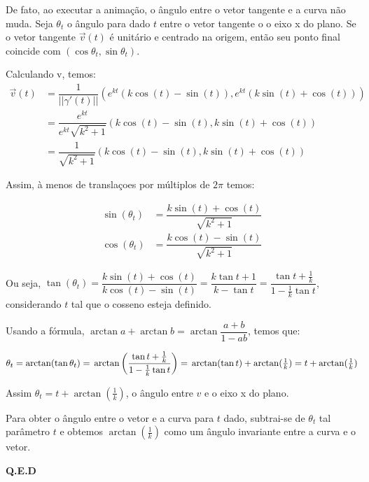 \documentclass[12pt,letterpaper]{article}
\begin{document}
\begin{enumerate}
	De fato, ao executar a animação, o ângulo entre o vetor tangente e a curva não muda. Seja $\theta_t$ o ângulo para dado $t$ entre o vetor tangente o o eixo x do plano. Se o vetor tangente $\vec v(t)$ é unitário e centrado na origem, então seu ponto final coincide com $(\cos \theta _t,\sin\theta _t)$.
	
	Calculando v, temos:
	\begin{align*}
		\vec v (t)&=\dfrac{1}{||\gamma'(t)||}\left(e^{k t} (k \cos(t) - \sin(t)), e^{kt} (k \sin(t) + \cos(t))\right)\\
		&=\dfrac{e^{kt}}{e^{k t}\sqrt{k^2 + 1} }\left(k \cos(t) - \sin(t), k \sin(t) + \cos(t)\right)\\
		&=\dfrac{1}{\sqrt{k^2 + 1} }\left(k \cos(t) - \sin(t), k \sin(t) + \cos(t)\right)
	\end{align*}
	
	Assim, à menos de translaçoes por múltiplos de $2\pi$ temos:
	
	\begin{align*}
	\sin (\theta_t)&=\dfrac{k \sin(t) + \cos(t)}{\sqrt{k^2 + 1}}\\
	\cos(\theta_t)&=\dfrac{k \cos(t) - \sin(t)}{\sqrt{k^2 + 1} }
	\end{align*}
	
	Ou seja, $\tan(\theta_t)=\dfrac{k \sin(t) + \cos(t)}{k \cos(t) - \sin(t)}=\dfrac{k\tan t+1}{k-\tan t}=\dfrac{\tan t+\frac1 k}{1-\frac1 k\tan t}$, considerando $t$ tal que o cosseno esteja definido.
	
	Usando a fórmula, $\arctan a + \arctan b = \arctan \dfrac {a + b} {1 - a b}$, temos que:
	
	$\theta_t=\arctan(\tan \theta_t)=\\\arctan\left(\dfrac{\tan t+\frac1 k}{1-\frac1 k\tan t}\right)=\\\arctan(\tan t)+\arctan(\frac1 k)= \\t+\arctan(\frac1 k)$
	
	Assim $\theta_t=t+\arctan(\frac1 k)$, o ângulo entre $v$ e o eixo x do plano.
	
	Para obter o ângulo entre o vetor e a curva\cite{wiki:Tangential_angle} para $t$ dado, subtrai-se de $\theta_t$ tal parâmetro $t$ e obtemos $\arctan(\frac1 k)$ como um ângulo invariante entre a curva e o vetor.
	
	\begin{flushright}
		\textbf{Q.E.D}
	\end{flushright}
%	
\end{enumerate}

	
\newpage



\end{document}
